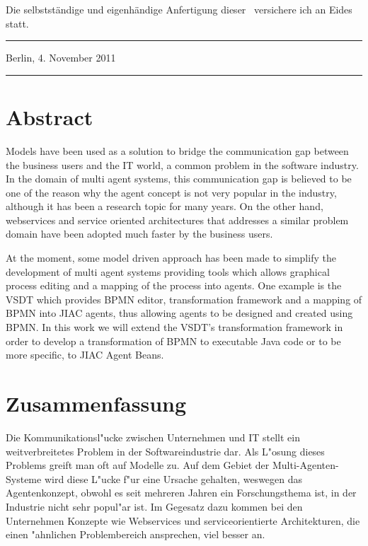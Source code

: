 
Die selbstst\"{a}ndige und eigenh\"{a}ndige Anfertigung dieser \ARTDERARBEIT\
versichere ich an Eides statt.

\vspace{4cm}
\parbox{6cm}{\hrule \strut \centering \small Berlin, 4. November 2011}
\hfill
\parbox{6cm}{\hrule \strut \centering \small \AUTOR}

\newpage



\section*{Abstract}
Models have been used as a solution to bridge the communication gap between the business users and the IT world, a common problem in the software industry. In the domain of multi agent systems, this communication gap is believed to be one of the reason why the agent concept is not very popular in the industry, although it has been a research topic for many years. On the other hand, webservices and service oriented architectures that addresses a similar problem domain have been adopted much faster by the business users. 
 
At the moment, some model driven approach has been made to simplify the development of multi agent systems providing tools which allows graphical process editing and a mapping of the process into agents. One example is the VSDT which provides BPMN editor, transformation framework and a mapping of BPMN into JIAC agents, thus allowing agents to be designed and created using BPMN. In this work we will extend the VSDT's transformation framework in order to develop a transformation of BPMN to executable Java code or to be more specific, to JIAC Agent Beans.


\section*{Zusammenfassung}
Die Kommunikationsl"ucke zwischen Unternehmen und IT stellt ein weitverbreitetes Problem in der Softwareindustrie dar. Als L"osung dieses Problems greift man oft auf Modelle zu. Auf dem Gebiet der Multi-Agenten-Systeme wird diese L"ucke f"ur eine Ursache gehalten, weswegen das Agentenkonzept, obwohl es seit mehreren Jahren ein Forschungsthema ist, in der Industrie nicht sehr popul"ar ist. Im Gegesatz dazu kommen bei den Unternehmen Konzepte wie Webservices und serviceorientierte Architekturen, die einen "ahnlichen Problembereich ansprechen, viel besser an.

